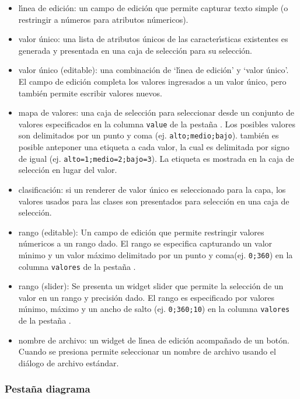 \begin{itemize}
\item l\'{\i}nea de edici\'on: un campo de edici\'on que permite capturar texto simple (o restringir a 
n\'umeros para atributos n\'umericos).
\item valor \'unico: una lista de atributos \'unicos de las caracter\'{\i}sticas existentes
es generada y presentada en una caja de selecci\'on para su selecci\'on.
\item  valor  \'unico (editable): una combinaci\'on de `l\'{\i}nea de edici\'on' y `valor \'unico'.
El campo de edici\'on completa los valores ingresados a un valor \'unico, pero también permite
escribir valores nuevos.
\item mapa de valores: una caja de selecci\'on para seleccionar desde un conjunto de valores especificados en la
columna \texttt{value} de la pesta\~na .  Los posibles valores son 
delimitados por un punto y coma (ej. \verb|alto;medio;bajo|). también es posible
anteponer una etiqueta a cada valor, la cual es delimitada por signo de igual (ej.
\verb|alto=1;medio=2;bajo=3|). La etiqueta es mostrada en la caja de selecci\'on en lugar
del valor.
\item clasificaci\'on: si un renderer de valor \'unico es seleccionado para la capa, los valores
usados para las clases son presentados para selecci\'on en una caja de selecci\'on.
\item rango (editable): Un campo de edici\'on que permite restringir valores n\'umericos a un
rango dado.  El rango se especifica capturando un valor m\'{\i}nimo y un valor m\'aximo
delimitado por un punto y coma(ej. \verb|0;360|) en la columna \texttt{valores} de
la pesta\~na .
\item rango (slider): Se presenta un widget slider que permite la selecci\'on de un valor
en un rango y precisi\'on dado.  El rango es especificado por valores m\'{\i}nimo, m\'aximo
y un ancho de salto (ej. \verb|0;360;10|) en la columna \texttt{valores} de
la pesta\~na .
\item nombre de archivo: un widget de l\'{\i}nea de edici\'on acompa\~nado de un bot\'on. Cuando se
presiona permite seleccionar un nombre de archivo usando el di\'alogo de archivo estándar.
\end{itemize}

\subsubsection{Pesta\~na diagrama}\label{sec:diagram}

